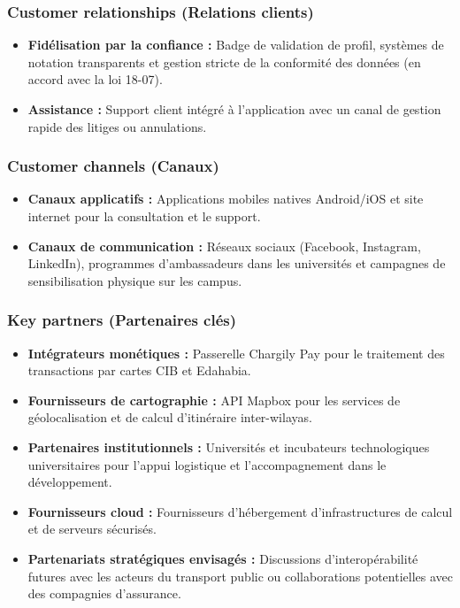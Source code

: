\documentclass[11pt,a4paper]{article}
\begin{document}
\subsubsection{Customer relationships (Relations clients)}
\begin{itemize}[leftmargin=1.5em]
  \item \textbf{Fidélisation par la confiance :} Badge de validation de profil, systèmes de notation transparents et gestion stricte de la conformité des données (en accord avec la loi 18-07).
  \item \textbf{Assistance :} Support client intégré à l'application avec un canal de gestion rapide des litiges ou annulations.
\end{itemize}

\subsubsection{Customer channels (Canaux)}
\begin{itemize}[leftmargin=1.5em]
  \item \textbf{Canaux applicatifs :} Applications mobiles natives Android/iOS et site internet pour la consultation et le support.
  \item \textbf{Canaux de communication :} Réseaux sociaux (Facebook, Instagram, LinkedIn), programmes d'ambassadeurs dans les universités et campagnes de sensibilisation physique sur les campus.
\end{itemize}

\subsubsection{Key partners (Partenaires clés)}
\begin{itemize}[leftmargin=1.5em]
  \item \textbf{Intégrateurs monétiques :} Passerelle Chargily Pay pour le traitement des transactions par cartes CIB et Edahabia.
  \item \textbf{Fournisseurs de cartographie :} API Mapbox pour les services de géolocalisation et de calcul d'itinéraire inter-wilayas.
  \item \textbf{Partenaires institutionnels :} Universités et incubateurs technologiques universitaires pour l'appui logistique et l'accompagnement dans le développement.
  \item \textbf{Fournisseurs cloud :} Fournisseurs d'hébergement d'infrastructures de calcul et de serveurs sécurisés.
  \item \textbf{Partenariats stratégiques envisagés :} Discussions d'interopérabilité futures avec les acteurs du transport public ou collaborations potentielles avec des compagnies d'assurance.
\end{itemize}
\end{document}
